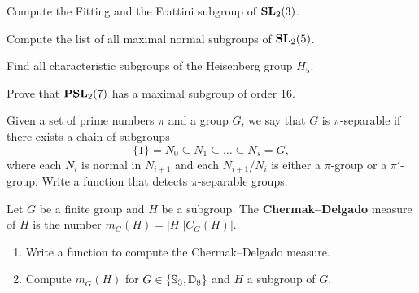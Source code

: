 \begin{prob}
	\label{prob:fitting}
	Compute the Fitting and the Frattini subgroup of $\mathbf{SL}_2(3)$.
\end{prob}

\begin{prob}
	\label{prob:maximal}
	Compute the list of all maximal normal subgroups of $\mathbf{SL}_2(5)$. 
\end{prob}

\begin{prob}
    Find all characteristic subgroups
    of the Heisenberg group $H_5$. 
\end{prob}

\begin{prob}
	\label{prob:PSL2(7)_max}
	Prove that $\mathbf{PSL}_2(7)$ has a maximal subgroup of order 16.
\end{prob}

\begin{prob}
    Given  a set of prime numbers $\pi$ and a group $G$, we say that $G$ is $\pi$-separable 
    if there exists a chain of subgroups
    \[
    \{1\} = N_0 \subseteq N_1\subseteq \ldots\subseteq N_s = G,
    \]
    where each $N_i$ is normal in $N_{i+1}$ and each $N_{i+1}/N_i$ is either a $\pi$-group 
    or a $\pi'$-group. Write a function that detects $\pi$-separable groups.
\end{prob}



\begin{prob}
	\label{prob:ChermakDelgado}
	Let $G$ be a finite group and $H$ be a subgroup. The \textbf{Chermak--Delgado} measure of $H$ 
	is the number $m_G(H)=|H||C_G(H)|$. 
	\begin{enumerate}[label=(\alph*)]
	\item Write a function to compute the Chermak--Delgado measure.
	\item Compute $m_G(H)$ for $G\in\{\mathbb{S}_3,\mathbb{D}_8\}$ and $H$ a subgroup of $G$. 
\end{enumerate}
\end{prob}

